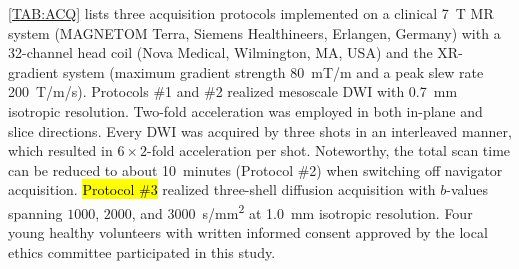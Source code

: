 \documentclass[journal,twoside,web]{ieeecolor}
\begin{document}
	\cref{TAB:ACQ} lists three acquisition protocols implemented on
	a clinical \SI{7}{\tesla} MR system
	(MAGNETOM Terra, Siemens Healthineers, Erlangen, Germany)
	with a 32-channel head coil (Nova Medical, Wilmington, MA, USA)
	and the XR-gradient system
	(maximum gradient strength \SI{80}{\milli\tesla/\meter} and
	a peak slew rate \SI{200}{\tesla/\meter/\second}).
	Protocols \#1 and \#2 realized mesoscale DWI with \SI{0.7}{mm}
	isotropic resolution. Two-fold acceleration was employed
	in both in-plane and slice directions.
	Every DWI was acquired by three shots in an interleaved manner,
	which resulted in $6 \times 2$-fold acceleration per shot.
	Noteworthy, the total scan time can be reduced to about 10~minutes
	(Protocol \#2) when switching off navigator acquisition.
	\hl{Protocol \#3} realized three-shell diffusion acquisition
	with $b$-values spanning $1000$, $2000$, and $3000$~\si{s/mm^2}
	at \SI{1.0}{mm} isotropic resolution.
	Four young healthy volunteers with written informed consent
	approved by the local ethics committee
	participated in this study.


%
%
\end{document}
